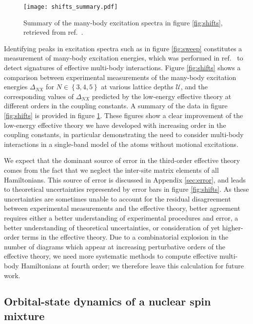 \documentclass[preprint,showkeys,nofootinbib]{revtex4-1}
\renewcommand{\set}[1]{\left\{#1\right\}} %
\newcommand{\U}{\mathcal{U}}
\newcommand{\1}{\mathds{1}}
\begin{document}
\begin{figure}
  \centering
  \texttt{[image: shifts\_summary.pdf]}
  \caption{\footnotesize Summary of the many-body excitation spectra
    in figure \ref{fig:shifts}, retrieved from
    ref.~\cite{goban2018emergence}.}
  \label{fig:shifts_summary}
\end{figure}

Identifying peaks in excitation spectra such as in figure
\ref{fig:sweep} constitutes a measurement of many-body excitation
energies, which was performed in ref.~\cite{goban2018emergence} to
detect signatures of effective multi-body interactions.  Figure
\ref{fig:shifts} shows a comparison between experimental measurements
of the many-body excitation energies $\Delta_{NX}$ for
$N\in\set{3,4,5}$ at various lattice depths $\U$, and the
corresponding values of $\Delta_{NX}$ predicted by the low-energy
effective theory at different orders in the coupling constants.  A
summary of the data in figure \ref{fig:shifts} is provided in figure
\ref{fig:shifts_summary}.  These figures show a clear improvement of
the low-energy effective theory we have developed with increasing
order in the coupling constants, in particular demonstrating the need
to consider multi-body interactions in a single-band model of the
atoms without motional excitations.

We expect that the dominant source of error in the third-order
effective theory comes from the fact that we neglect the inter-site
matrix elements of all Hamiltonians.  This source of error is
discussed in Appendix \ref{sec:error}, and leads to theoretical
uncertainties represented by error bars in figure \ref{fig:shifts}.
As these uncertainties are sometimes unable to account for the
residual disagreement between experimental measurements and the
effective theory, better agreement requires either a better
understanding of experimental procedures and error, a better
understanding of theoretical uncertainties, or consideration of yet
higher-order terms in the effective theory.  Due to a combinatorial
explosion in the number of diagrams which appear at increasing
perturbative orders of the effective theory, we need more systematic
methods to compute effective multi-body Hamiltonians at fourth order;
we therefore leave this calculation for future work.

\subsection{Orbital-state dynamics of a nuclear spin mixture}
\end{document}
